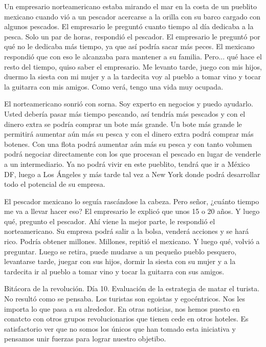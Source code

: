 \documentclass[11pt,twoside,openright,a6paper]{book}
\begin{document}
Un empresario norteamericano estaba mirando el mar en la costa de un
pueblito mexicano cuando vió a un pescador acercarse a la orilla con
su barco cargado con algunos pescados. El empresario le preguntó cuanto
tiempo al día dedicaba a la pesca. Solo un par de horas, respondió el
pescador. El empresario le preguntó por qué no le dedicaba más tiempo,
ya que así podría sacar más peces. El mexicano respondió que con eso
le alcanzaba para mantener a su familia. Pero... qué hace el resto del
tiempo, quiso saber el empresario. Me levanto tarde, juego con mis hijos,
duermo la siesta con mi mujer y a la tardecita voy al pueblo a tomar vino
y tocar la guitarra con mis amigos. Como verá, tengo una vida muy ocupada.

El norteamericano sonrió con sorna. Soy experto en negocios y puedo
ayudarlo. Usted debería pasar más tiempo pescando, así tendría más
pescados y con el dinero extra se podría comprar un bote más grande. Un
bote más grande le permitirá aumentar aún más su pesca y con el dinero
extra podrá comprar más botenes. Con una flota podrá aumentar aún más su
pesca y con tanto volumen podrá negociar directamente con los que procesan
el pescado en lugar de venderle a un intermediario. Ya no podrá vivir en
este pueblito, tendrá que ir a México DF, luego a Los Ángeles y más tarde
tal vez a New York donde podrá desarrollar todo el potencial de su empresa.

El pescador mexicano lo seguía rascándose la cabeza. Pero señor, ¿cuánto
tiempo me va a llevar hacer eso? El empresario le explicó que unos 15 o
20 años. Y luego qué, pregunto el pescador. Ahí viene la mejor parte,
le respondió el norteamericano. Su empresa podrá salir a la bolsa,
venderá acciones y se hará rico. Podría obtener millones. Millones,
repitió el mexicano. Y luego qué, volvió a preguntar. Luego se retira,
puede mudarse a un pequeño pueblo pesquero, levantarse tarde, juegar con
sus hijos, dormir la siesta con su mujer y a la tardecita ir al pueblo a
tomar vino y tocar la guitarra con sus amigos.


\vspace{0.5cm}
\hrulefill\hspace{0.2cm} \decofourleft\decofourright \hspace{0.2cm} \hrulefill
\vspace{0.5cm}

Bitácora de la revolución. Día 10. Evaluación de la estrategia de
matar el turista. No resultó como se pensaba. Los turistas son egoistas y
egocéntricos. Nos les importa lo que pasa a su alrededor. En otras noticias,
nos hemos puesto en conatcto con otros grupos revolucionarios que tienen
cede en otros hoteles. Es satisfactorio ver que no somos los únicos que han
tomado esta iniciativa y pensamos unir fuerzas para lograr nuestro objetibo.
\end{document}
